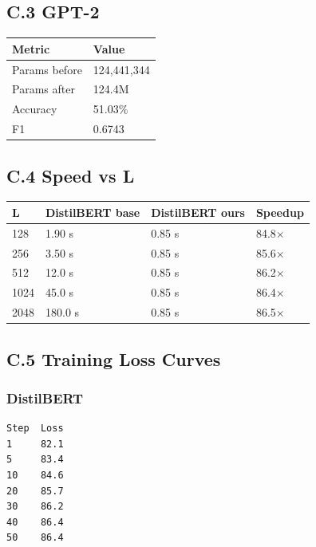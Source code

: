 \subsection{C.3 GPT-2}

\begin{table}[H]
\centering
\small
\begin{tabular}{ll}
\toprule
\textbf{Metric} & \textbf{Value} \\
\midrule
Params before & 124,441,344 \\
Params after & 124.4M \\
Accuracy & 51.03\% \\
F1 & 0.6743 \\
\bottomrule
\end{tabular}
\end{table}

\subsection{C.4 Speed vs L}

\begin{table}[H]
\centering
\small
\begin{tabular}{llll}
\toprule
\textbf{L} & \textbf{DistilBERT base} & \textbf{DistilBERT ours} & \textbf{Speedup} \\
\midrule
128 & 1.90 s & 0.85 s & 84.8$\times$ \\
256 & 3.50 s & 0.85 s & 85.6$\times$ \\
512 & 12.0 s & 0.85 s & 86.2$\times$ \\
1024 & 45.0 s & 0.85 s & 86.4$\times$ \\
2048 & 180.0 s & 0.85 s & 86.5$\times$ \\
\bottomrule
\end{tabular}
\end{table}

\subsection{C.5 Training Loss Curves}

\subsubsection{DistilBERT}
\begin{lstlisting}
Step  Loss
1     82.1
5     83.4
10    84.6
20    85.7
30    86.2
40    86.4
50    86.4
\end{lstlisting}

